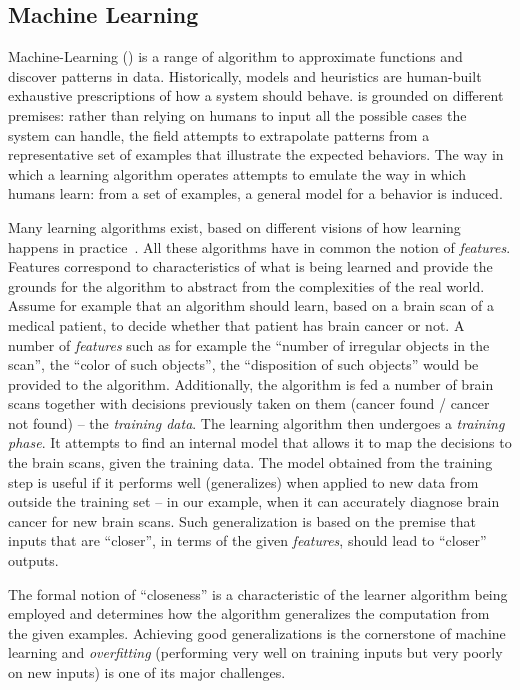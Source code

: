 \subsection{Machine Learning}



Machine-Learning (\ML) \cite{mitchell:1997} is a range of algorithm to
approximate functions and discover patterns in data.
Historically, models and heuristics are human-built exhaustive prescriptions of
how a system should behave. \ML is grounded on different premises:
rather than relying on humans to input all the possible cases the system can
handle, the field attempts to extrapolate patterns from a representative
set of examples that illustrate the expected behaviors. The way in which a
learning algorithm operates attempts to emulate the way in which humans learn:
from a set of examples, a general model for a behavior is induced.

Many learning algorithms exist, based on different visions of how learning
happens in practice~\cite{Domingos:2015}. All these algorithms have in common
the notion of \emph{features}. Features correspond to characteristics of what is
being learned and provide the grounds for the algorithm to abstract from the
complexities of the real world. Assume for example that an algorithm should
learn, based on a brain scan of a medical patient, to decide whether that
patient has brain cancer or not. A number of \emph{features} such as for example
the ``number of irregular objects in the scan'', the ``color of such objects'',
the ``disposition of such objects'' would be provided to the algorithm.
Additionally, the algorithm is fed a number of brain scans together with
decisions previously taken on them (cancer found / cancer not found) -- the
\emph{training data}.
The learning algorithm then undergoes a \emph{training phase}. It attempts to
find an internal model that allows it to map the decisions to the brain scans,
given the training data. The model obtained from the training step is useful if
it performs well (generalizes) when applied to new data from outside the training
set -- in our example, when it can accurately diagnose brain cancer for new
brain scans. Such generalization is based on the premise that inputs that are
``closer'', in terms of the given \emph{features}, should lead to ``closer''
outputs.

The formal notion of ``closeness'' is a characteristic of the learner
algorithm being employed and determines how the algorithm generalizes the computation from
the given examples. Achieving good generalizations is the cornerstone of
machine learning and \emph{overfitting} (performing very well on training
inputs but very poorly on new inputs) is one of its major challenges.

